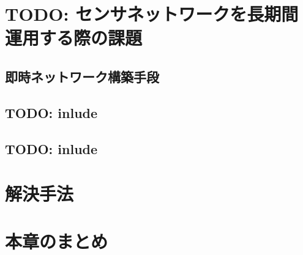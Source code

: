 \section{TODO: センサネットワークを長期間運用する際の課題}

\subsection{即時ネットワーク構築手段}

\newpage

\subsection{TODO: inlude}

\subsection{TODO: inlude}

\newpage

\section{解決手法}

\section{本章のまとめ}
